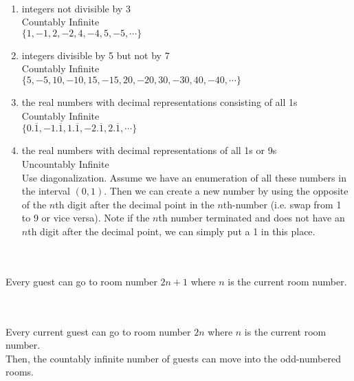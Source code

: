 \documentclass[12pt]{article}  %
\begin{document}
\\
\begin{enumerate}
    \item integers not divisible by 3\\
    Countably Infinite\\
    $\{1,-1,2,-2,4,-4,5,-5,\cdots\}$
    \item integers divisible by 5 but not by 7\\
    Countably Infinite\\
    $\{5,-5,10,-10,15,-15,20,-20,30,-30,40,-40,\cdots\}$
    \item the real numbers with decimal representations consisting of all 1s\\
    Countably Infinite\\
    $\{0.\overline{1},-1.\overline{1},1.\overline{1},-2.\overline{1},2.\overline{1},\cdots\}$
    \item the real numbers with decimal representations of all 1s or 9s\\
    Uncountably Infinite\\
    Use diagonalization. Assume we have an enumeration of all these numbers in the interval $(0,1)$. Then we can create a new number by using the opposite of the $n$th digit after the decimal point in the $n$th-number (i.e. swap from 1 to 9 or vice versa). Note if the $n$th number terminated and does not have an $n$th digit after the decimal point, we can simply put a 1 in this place.
    
\end{enumerate}

\\
\\
Every guest can go to room number $2n+1$ where $n$ is the current room number.

\\
\\
Every current guest can go to room number $2n$ where $n$ is the current room number.\\
Then, the countably infinite number of guests can move into the odd-numbered rooms.
\end{document}
